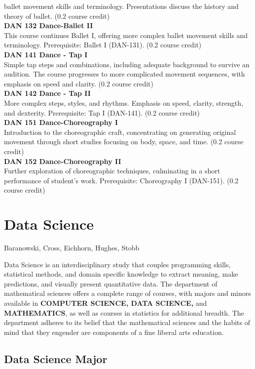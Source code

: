 \documentclass[
  letterpaper,
]{scrbook}
\begin{document}
ballet movement skills and terminology. Presentations discuss the
history and theory of ballet. (0.2 course credit)\\
\textbf{DAN 132 Dance-Ballet II}\\
This course continues Ballet I, offering more complex ballet movement
skills and terminology. Prerequisite: Ballet I (DAN-131). (0.2 course
credit)\\
\textbf{DAN 141 Dance - Tap I}\\
Simple tap steps and combinations, including adequate background to
survive an audition. The course progresses to more complicated movement
sequences, with emphasis on speed and clarity. (0.2 course credit)\\
\textbf{DAN 142 Dance - Tap II}\\
More complex steps, styles, and rhythms. Emphasis on speed, clarity,
strength, and dexterity. Prerequisite: Tap I (DAN-141). (0.2 course
credit)\\
\textbf{DAN 151 Dance-Choreography I}\\
Introduction to the choreographic craft, concentrating on generating
original movement through short studies focusing on body, space, and
time. (0.2 course credit)\\
\textbf{DAN 152 Dance-Choreography II}\\
Further exploration of choreographic techniques, culminating in a short
performance of student's work. Prerequisite: Choreography I (DAN-151).
(0.2 course credit)

\section{Data Science}\label{data-science}

Baranowski, Cross, Eichhorn, Hughes, Stobb

Data Science is an interdisciplinary study that couples programming
skills, statistical methods, and domain specific knowledge to extract
meaning, make predictions, and visually present quantitative data. The
department of mathematical sciences offers a complete range of courses,
with majors and minors available in \textbf{COMPUTER SCIENCE, DATA
SCIENCE,} and \textbf{MATHEMATICS}, as well as courses in statistics for
additional breadth. The department adheres to its belief that the
mathematical sciences and the habits of mind that they engender are
components of a fine liberal arts education.

\subsection{Data Science Major}\label{data-science-major}
\end{document}
